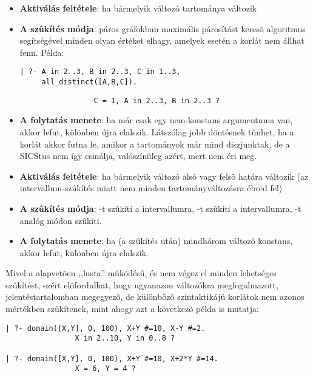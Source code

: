 \begin{itemize}
\item {\bf Aktiválás feltétele}: ha bármelyik változó tartománya változik
\item {\bf A szûkítés módja}: páros gráfokban maximális párosítást keresõ
algoritmus segítségével minden olyan értéket elhagy, amelyek esetén a korlát nem
állhat fenn. Példa:
\begin{verbatim}
| ?- A in 2..3, B in 2..3, C in 1..3, 
     all_distinct([A,B,C]).
\end{verbatim}
\begin{verbatim}
                 C = 1, A in 2..3, B in 2..3 ? 
\end{verbatim}
\item {\bf A folytatás menete}: ha már csak egy nem-konstans argumentuma van,
akkor lefut, különben újra elalszik. Látszólag jobb döntésnek tûnhet, ha a korlát
akkor futna le, amikor a tartományok már mind diszjunktak, de a SICStus nem így
csinálja, valószínûleg azért, mert nem éri meg.
\end{itemize}

\begin{itemize}
\item {\bf Aktiválás feltétele}: ha bármelyik változó alsó vagy felsõ határa változik (az
intervallum-szûkítés miatt nem minden tartományváltozásra ébred fel)
\item {\bf A szûkítés módja}: -t szûkíti a  intervallumra, -t szûkiti a  intervallumra, -t analóg módon szûkíti.
\item {\bf A folytatás menete}: ha (a szûkítés után) mindhárom változó konstans, akkor lefut,
különben újra elalszik.
\end{itemize}

Mivel a \clpfd alapvetõen ,,lusta'' mûködésû, és nem végez el minden lehetséges
szûkítést, ezért elõfordulhat, hogy ugyanazon változókra megfogalmazott, jelentéstartalomban
megegyezõ, de különbözõ szintaktikájú korlátok nem azonos mértékben szûkítenek,
mint ahogy azt a következõ példa is mutatja:

\begin{verbatim}
| ?- domain([X,Y], 0, 100), X+Y #=10, X-Y #=2.
                X in 2..10, Y in 0..8 ? 

| ?- domain([X,Y], 0, 100), X+Y #=10, X+2*Y #=14.
                X = 6, Y = 4 ? 
\end{verbatim}

